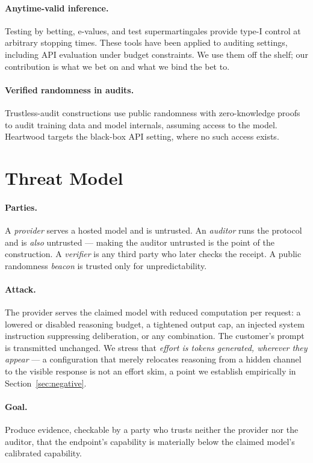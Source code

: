 \documentclass[11pt]{article}
\theoremstyle{definition}
\begin{document}
\paragraph{Anytime-valid inference.} Testing by betting, e-values, and test
supermartingales provide type-I control at arbitrary stopping times. These tools
have been applied to auditing settings, including API evaluation under budget
constraints. We use them off the shelf; our contribution is what we bet on and
what we bind the bet to.

\paragraph{Verified randomness in audits.} Trustless-audit constructions use
public randomness with zero-knowledge proofs to audit training data and model
internals, assuming access to the model. Heartwood targets the black-box API
setting, where no such access exists.

\section{Threat Model}

\paragraph{Parties.} A \emph{provider} serves a hosted model and is untrusted.
An \emph{auditor} runs the protocol and is \emph{also} untrusted --- making the
auditor untrusted is the point of the construction. A \emph{verifier} is any
third party who later checks the receipt. A public randomness \emph{beacon} is
trusted only for unpredictability.

\paragraph{Attack.} The provider serves the claimed model with reduced
computation per request: a lowered or disabled reasoning budget, a tightened
output cap, an injected system instruction suppressing deliberation, or any
combination. The customer's prompt is transmitted unchanged. We stress that
\emph{effort is tokens generated, wherever they appear} --- a configuration that
merely relocates reasoning from a hidden channel to the visible response is not
an effort skim, a point we establish empirically in
Section~\ref{sec:negative}.

\paragraph{Goal.} Produce evidence, checkable by a party who trusts neither the
provider nor the auditor, that the endpoint's capability is materially below the
claimed model's calibrated capability.
\end{document}
